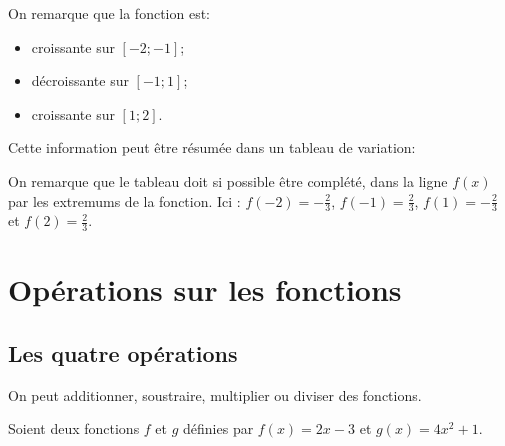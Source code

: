 \documentclass[a4paper,12pt]{scrartcl}
\begin{document}
On remarque que la fonction est:

\begin{itemize}
\item croissante sur $[-2 ; -1]$;
\item décroissante sur $[-1 ; 1]$;
\item croissante sur $[1 ; 2]$.
\end{itemize}

Cette information peut être résumée dans un tableau de variation:

\begin{center}
\end{center}

On remarque que le tableau doit si possible être complété, dans la ligne \og $f(x)$ \fg{} par les extremums de la fonction. Ici : $f(-2) = -\frac{2}{3}$, $f(-1) = \frac{2}{3}$, $f(1) = -\frac{2}{3}$ et $f(2) = \frac{2}{3}$.

\section{Opérations sur les fonctions}

\subsection{Les quatre opérations}\label{quatreOp}

On peut additionner, soustraire, multiplier ou diviser des fonctions.

\exemple{}
Soient deux fonctions $f$ et $g$ définies par $f(x) = 2x-3$ et $g(x) = 4x^2+1$.
\end{document}
